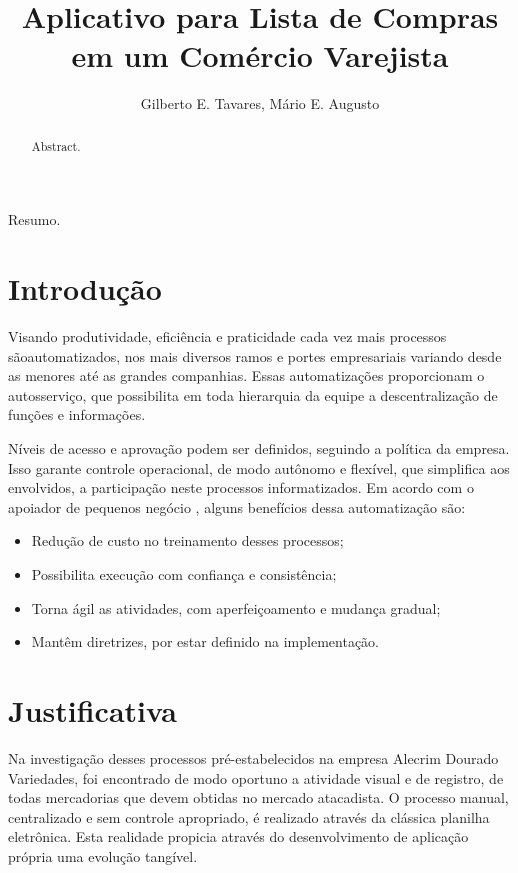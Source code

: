 \documentclass[12pt]{article}
\title{Aplicativo para Lista de Compras\\em um Comércio Varejista}
\author{Gilberto E. Tavares\inst{1}, Mário E. Augusto\inst{1}}
\begin{document}
\maketitle

\begin{abstract}
  Abstract.
\end{abstract}

\begin{resumo}
  Resumo.
\end{resumo}


\section{Introdução}

Visando produtividade, eficiência e praticidade cada vez mais processos sãoautomatizados, nos mais diversos ramos e portes empresariais variando desde as menores até as grandes companhias. Essas automatizações proporcionam o autosserviço, que possibilita em toda hierarquia da equipe a descentralização de funções e informações.

Níveis de acesso e aprovação podem ser definidos, seguindo a política da empresa. Isso garante controle operacional, de modo autônomo e flexível, que simplifica aos envolvidos, a participação neste processos informatizados. Em acordo com o apoiador de pequenos negócio \cite{sebrae2015}, alguns benefícios dessa automatização são:

\begin{itemize}
\item Redução de custo no treinamento desses processos;
\item Possibilita execução com confiança e consistência;
\item Torna ágil as atividades, com aperfeiçoamento e mudança gradual;
\item Mantêm diretrizes, por estar definido na implementação.
\end{itemize}

\section{Justificativa}

Na investigação desses processos pré-estabelecidos na empresa Alecrim Dourado Variedades, foi encontrado de modo oportuno a atividade visual e de registro, de todas mercadorias que devem obtidas no mercado atacadista. O processo manual, centralizado e sem controle apropriado, é realizado através da clássica planilha eletrônica. Esta realidade propicia através do desenvolvimento de aplicação própria uma evolução tangível.
\end{document}
